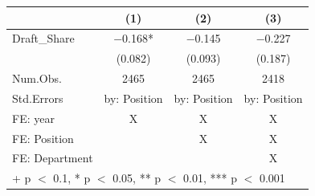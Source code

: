 \begin{table}
\centering
\begin{tabular}[t]{lccc}
\toprule
& (1) & (2) & (3) \\
\midrule
Draft\_Share & \num{-0.168}* & \num{-0.145} & \num{-0.227}\\
 & (\num{0.082}) & (\num{0.093}) & (\num{0.187})\\
\midrule
Num.Obs. & \num{2465} & \num{2465} & \num{2418}\\
Std.Errors & by: Position & by: Position & by: Position\\
FE: year & X & X & X\\
FE: Position &  & X & X\\
FE: Department &  &  & X\\
\bottomrule
\multicolumn{4}{l}{\rule{0pt}{1em}+ p $<$ 0.1, * p $<$ 0.05, ** p $<$ 0.01, *** p $<$ 0.001}\\
\end{tabular}
\end{table}